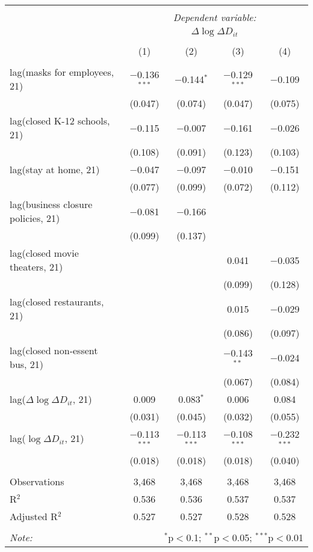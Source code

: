 \begin{tabular}{@{\extracolsep{1pt}}lcccc} 
\\[-1.8ex]\hline 
\hline \\[-1.8ex] 
 & \multicolumn{4}{c}{\textit{Dependent variable:}} \\ 
\cline{2-5} 
 & \multicolumn{4}{c}{$\Delta \log \Delta D_{it}$} \\ 
\\[-1.8ex] & (1) & (2) & (3) & (4)\\ 
\hline \\[-1.8ex] 
 lag(masks for employees, 21) & $-$0.136$^{***}$ & $-$0.144$^{*}$ & $-$0.129$^{***}$ & $-$0.109 \\ 
  & (0.047) & (0.074) & (0.047) & (0.075) \\ 
  lag(closed K-12 schools, 21) & $-$0.115 & $-$0.007 & $-$0.161 & $-$0.026 \\ 
  & (0.108) & (0.091) & (0.123) & (0.103) \\ 
  lag(stay at home, 21) & $-$0.047 & $-$0.097 & $-$0.010 & $-$0.151 \\ 
  & (0.077) & (0.099) & (0.072) & (0.112) \\ 
  lag(business closure policies, 21) & $-$0.081 & $-$0.166 &  &  \\ 
  & (0.099) & (0.137) &  &  \\ 
  lag(closed movie theaters, 21) &  &  & 0.041 & $-$0.035 \\ 
  &  &  & (0.099) & (0.128) \\ 
  lag(closed restaurants, 21) &  &  & 0.015 & $-$0.029 \\ 
  &  &  & (0.086) & (0.097) \\ 
  lag(closed non-essent bus, 21) &  &  & $-$0.143$^{**}$ & $-$0.024 \\ 
  &  &  & (0.067) & (0.084) \\ 
  lag($\Delta \log \Delta D_{it}$, 21) & 0.009 & 0.083$^{*}$ & 0.006 & 0.084 \\ 
  & (0.031) & (0.045) & (0.032) & (0.055) \\ 
  lag($\log \Delta D_{it}$, 21) & $-$0.113$^{***}$ & $-$0.113$^{***}$ & $-$0.108$^{***}$ & $-$0.232$^{***}$ \\ 
  & (0.018) & (0.018) & (0.018) & (0.040) \\ 
 \hline \\[-1.8ex] 
Observations & 3,468 & 3,468 & 3,468 & 3,468 \\ 
R$^{2}$ & 0.536 & 0.536 & 0.537 & 0.537 \\ 
Adjusted R$^{2}$ & 0.527 & 0.527 & 0.528 & 0.528 \\ 
\hline 
\hline \\[-1.8ex] 
\textit{Note:}  & \multicolumn{4}{r}{$^{*}$p$<$0.1; $^{**}$p$<$0.05; $^{***}$p$<$0.01} \\ 
\end{tabular} 